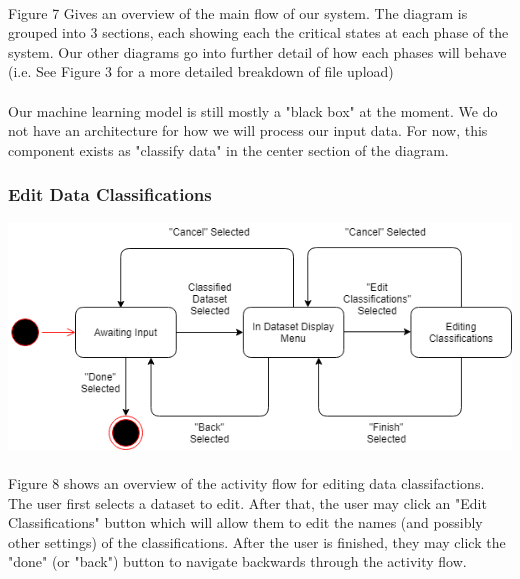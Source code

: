 \documentclass[12pt,oneside,letterpaper]{article}
\begin{document}
\paragraph{}Figure 7 Gives an overview of the main flow of our system. The diagram is grouped into 3 sections, each showing each the critical states at each phase of the system. Our other diagrams go into further detail of how each phases will behave (i.e. See Figure 3 for a more detailed breakdown of file upload)

\paragraph{}Our machine learning model is still mostly a "black box" at the moment. We do not have an architecture for how we will process our input data. For now, this component exists as "classify data" in the center section of the diagram.

 \subsubsection{Edit Data Classifications}
\includegraphics[scale = 0.70]{bread_state_diagram.png}
\begingroup
{}
\endgroup

\paragraph{}Figure 8 shows an overview of the activity flow for editing data classifactions. The user first selects a dataset to edit. After that, the user may click an "Edit Classifications" button which will allow them to edit the names (and possibly other settings) of the classifications. After the user is finished, they may click the "done" (or "back") button to navigate backwards through the activity flow.
\end{document}
